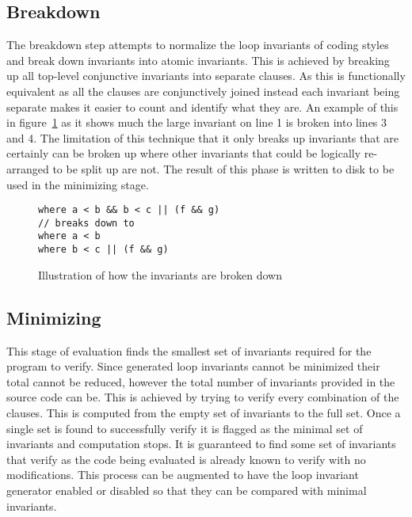\subsection{Breakdown}

The breakdown step attempts to normalize the loop invariants of coding styles
and break down invariants into atomic invariants.
This is achieved by breaking up all top-level conjunctive invariants into
separate  clauses.
As this is functionally equivalent as all the  clauses are
conjunctively joined instead each invariant being separate makes it easier to count
and identify what they are.
An example of this in figure~\ref{lst:breakdown} as it shows much the large
invariant on line 1 is broken into lines 3 and 4.
The limitation of this technique that it only breaks up invariants that are
certainly can be broken up where other invariants that could be logically
re-arranged to be split up are not.
The result of this phase is written to disk to be used in the minimizing stage.

\begin{figure}[ht]
\begin{lstlisting}
where a < b && b < c || (f && g)
// breaks down to
where a < b
where b < c || (f && g)
\end{lstlisting}
\caption{Illustration of how the invariants are broken down}
\label{lst:breakdown}
\end{figure}


\subsection{Minimizing}

This stage of evaluation finds the smallest set of invariants
required for the program to verify.
Since generated loop invariants cannot be minimized their total cannot be
reduced, however the total number of invariants provided in the source code can
be.
This is achieved by trying to verify every combination of the  clauses.
This is computed from the empty set of invariants to the full set.
Once a single set is found to successfully verify it is flagged as the minimal
set of invariants and computation stops.
It is guaranteed to find some set of invariants that verify as the code being
evaluated is already known to verify with no modifications.
This process can be augmented to have the loop invariant generator enabled or
disabled so that they can be compared with minimal invariants.

